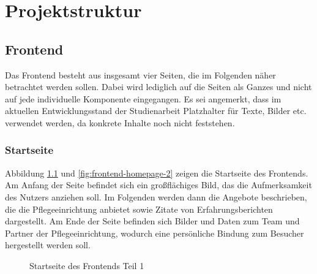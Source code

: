 \chapter{Projektstruktur}

%
%
\section{Frontend}
\label{sec:struktur-frontend}
Das Frontend besteht aus insgesamt vier Seiten, die im Folgenden näher betrachtet werden sollen. Dabei wird lediglich auf die Seiten als Ganzes und nicht auf jede individuelle Komponente eingegangen. Es sei angemerkt, dass im aktuellen Entwicklungsstand der Studienarbeit Platzhalter für Texte, Bilder etc. verwendet werden, da konkrete Inhalte noch nicht feststehen.

%
%
\subsection{Startseite}

Abbildung \ref{fig:frontend-homepage-1} und \ref{fig:frontend-homepage-2} zeigen die Startseite des Frontends. Am Anfang der Seite befindet sich ein großflächiges Bild, das die Aufmerksamkeit des Nutzers anziehen soll. Im Folgenden werden dann die Angebote beschrieben, die die Pflegeeinrichtung anbietet sowie Zitate von Erfahrungsberichten dargestellt. Am Ende der Seite befinden sich Bilder und Daten zum Team und Partner der Pflegeeinrichtung, wodurch eine persönliche Bindung zum Besucher hergestellt werden soll.

\begin{figure}[H]
  \setlength{\fboxsep}{0pt}
  \setlength{\fboxrule}{0.5pt}
  \centering
  \caption[Startseite des Frontends Teil 1]{Startseite des Frontends Teil 1}
  \label{fig:frontend-homepage-1}
\end{figure}

